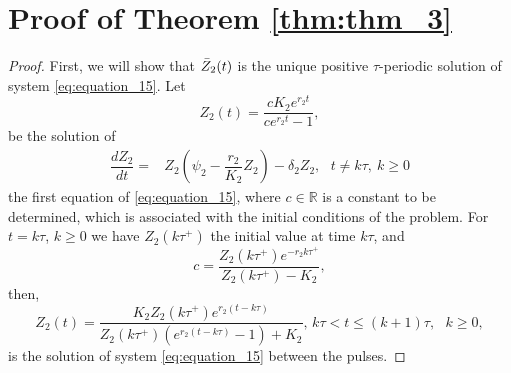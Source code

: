 \documentclass[10pt,letterpaper]{article}
\begin{document}
\section{Proof of Theorem \eqref{thm:thm_3}} 
\label{appendix:A}
\begin{proof}
First, we will show that $\Bar{Z}_2(t)$ is the unique positive $\tau$-periodic solution of system \eqref{eq:equation_15}. Let 
\begin{equation}\label{eq:equation_52}
    Z_2(t) = \dfrac{c K_2 e^{r_2 t}}{ce^{r_2 t}-1},
\end{equation}be the solution of 
\begin{eqnarray}\label{eq:equation_53}
    \dfrac{dZ_2}{dt}=&Z_2\left(\psi_2-\dfrac{r_2}{K_2}Z_2\right)-\delta_2Z_2,\mbox{   } t \neq k\tau, \ k \geq 0 
\end{eqnarray}the first equation of \eqref{eq:equation_15}, where $c \in \mathbb{R}$ is a constant to be determined, which is associated with the initial conditions of the problem. 
For $t = k\tau$, $k\geq 0$ we have $Z_2(k\tau^+)$ the initial value at time $k\tau$, and
\begin{equation}\label{eq:equation_54}
    c= \dfrac{Z_2(k\tau^+)e^{-r_2 k\tau^+}}{Z_2(k\tau^+)-K_2},
\end{equation}
then,
\begin{equation}\label{eq:equation_55}
Z_2(t) = \dfrac{K_2 Z_2(k\tau^+) e^{r_2 (t-k\tau)}}{Z_2(k\tau^+)\left(e^{r_2 (t-k\tau)}     -1\right)+K_2} \mbox{, }  k\tau < t \leq (k+1)\tau, \mbox{ }k \geq 0,
\end{equation}
is the solution of system \eqref{eq:equation_15} between the pulses.


\end{proof}
\end{document}
